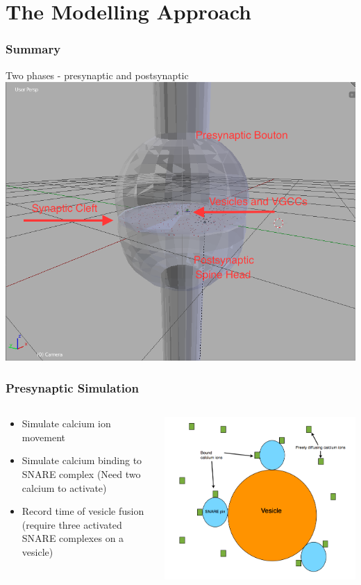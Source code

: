 \documentclass{beamer}
\begin{document}
\section{The Modelling Approach}
\frame
{
    \frametitle{Summary}
    Two phases - presynaptic and postsynaptic
    \includegraphics[width=1\textwidth]{fig2.png}
}

\frame
{
    \frametitle{Presynaptic Simulation}
    \begin{columns}
    \begin{column}{0.5\textwidth}
    \begin{itemize}
        \item Simulate calcium ion movement
        \item Simulate calcium binding to SNARE complex (Need two calcium to activate)
        \item Record time of vesicle fusion (require three activated SNARE complexes on a vesicle)
    \end{itemize}
    \end{column}
    \begin{column}{0.5\textwidth}
    \includegraphics[width=1\textwidth]{presynaptic.png}
    \end{column}
\end{columns}
}
\end{document}
